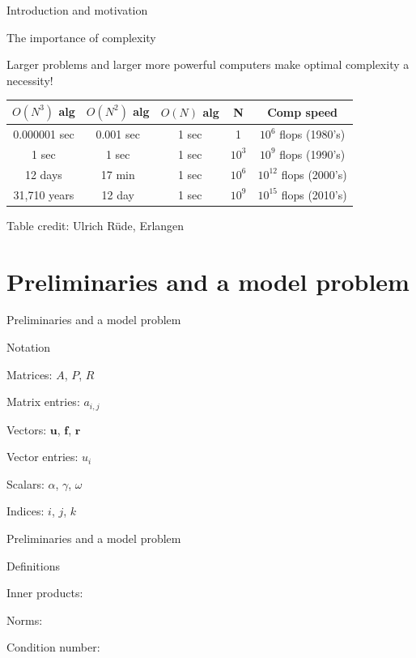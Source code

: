 \documentclass[18pt,xcolor=table]{beamer}
\begin{document}
\begin{frame}{Introduction and motivation}
\begin{block}{The importance of complexity}
\bit
\item Larger problems and larger more powerful computers make optimal complexity a necessity!
\eit
\begin{table}
\begin{tabular}{c | c | c | c | c}
$O(N^3)$ alg & $O(N^2)$ alg & $O(N)$ alg & N & Comp speed \\
\hline
0.000001 sec &  0.001 sec & 1 sec & 1 & $10^6$ flops (1980's) \\
1 sec &  1 sec & 1 sec & $10^3$ & $10^9$ flops (1990's) \\
12 days &  17 min & 1 sec & $10^6$ & $10^{12}$ flops (2000's) \\
31,710 years &  12 day & 1 sec & $10^9$ & $10^{15}$ flops (2010's)
\end{tabular}
\end{table}
\end{block}
\footnotesize{Table credit: Ulrich R\"ude, Erlangen}
\end{frame}



\section{Preliminaries and a model problem}

\begin{frame}{Preliminaries and a model problem}
\begin{block}{Notation}
\bit
\item Matrices: $A$, $P$, $R$
\item Matrix entries: $a_{i,j}$
\item Vectors: $\mathbf{u}$, $\mathbf{f}$, $\mathbf{r}$
\item Vector entries: $u_i$
\item Scalars: $\alpha$, $\gamma$, $\omega$
\item Indices: $i$, $j$, $k$
\eit
\end{block}
\end{frame}

\begin{frame}{Preliminaries and a model problem}
\begin{block}{Definitions}
\bit
\item Inner products: 
\item Norms: 
\item Condition number:
\eit
\end{block}
\end{frame}
\end{document}
